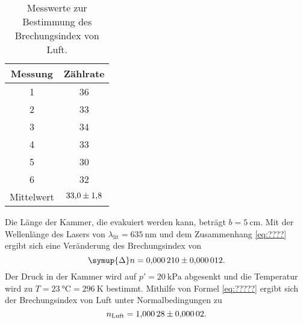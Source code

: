 \begin{table} [H]
    \centering
    \caption{Messwerte zur Bestimmung des Brechungsindex von Luft.}
    \label{tab:Brechungsindex}
    \begin{tabular}{S S}
      \toprule
      {Messung} & {Zählrate} \\
        & 36 \\
      2  & 33 \\
      3  & 34 \\
      4  & 33 \\
      5  & 30 \\
      6  & 32 \\
      \midrule
      {Mittelwert} & $\num{33.0+-1.8}$ \\  
      \bottomrule
    \end{tabular}
\end{table}

Die Länge der Kammer, die evakuiert werden kann, beträgt $b = \qty{5}{\centi\metre}$. Mit der Wellenlänge des Lasers von
$\lambda_{\text{lit}}=\qty{635}{\nano\metre}$ und dem Zusammenhang \eqref{eq:????} ergibt sich eine Veränderung des 
Brechungsindex von
\begin{equation*}
    \symup{\Delta}n = \num{0.000210+-0.000012}.
\end{equation*}
Der Druck in der Kammer wird auf $p'=\qty{20}{\kilo\pascal}$ abgesenkt und die Temperatur wird zu 
$T=\qty{23}{\celsius}=\qty{296}{\kelvin}$ bestimmt.
Mithilfe von Formel \eqref{eq:?????} ergibt sich der Brechungsindex von Luft unter Normalbedingungen zu 
\begin{equation*}
    n_\text{Luft} = \num{1.00028+-0.00002}.
\end{equation*}
